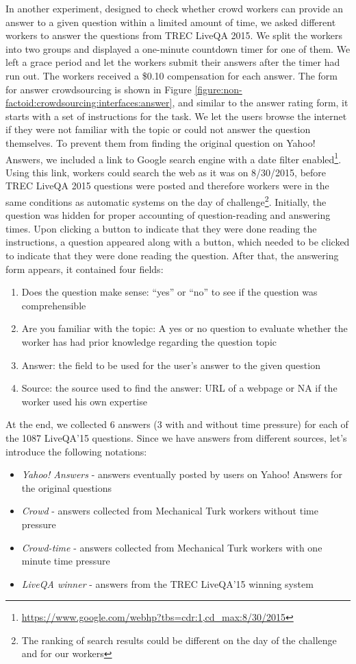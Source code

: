In another experiment, designed to check whether crowd workers can provide an answer to a given question within a limited amount of time, we asked different workers to answer the questions from TREC LiveQA 2015.
We split the workers into two groups and displayed a one-minute countdown timer for one of them.
We left a grace period and let the workers submit their answers after the timer had run out.
The workers received a \$0.10 compensation for each answer.
The form for answer crowdsourcing is shown in Figure \ref{figure:non-factoid:crowdsourcing:interfaces:answer}, and similar to the answer rating form, it starts with a set of instructions for the task.
We let the users browse the internet if they were not familiar with the topic or could not answer the question themselves.
To prevent them from finding the original question on Yahoo! Answers, we included a link to Google search engine with a date filter enabled\footnote{\href{url}{https://www.google.com/webhp?tbs=cdr:1,cd\_max:8/30/2015}}.
Using this link, workers could search the web as it was on 8/30/2015, before TREC LiveQA 2015 questions were posted and therefore workers were in the same conditions as automatic systems on the day of challenge\footnote{The ranking of search results could be different on the day of the challenge and for our workers}.
Initially, the question was hidden for proper accounting of question-reading and answering times.
Upon clicking a button to indicate that they were done reading the instructions, a question appeared along with a button, which needed to be clicked to indicate that they were done reading the question.
After that, the answering form appears, it contained four fields:
\begin{enumerate}[itemsep=0em]
\item Does the question make sense: ``yes'' or ``no'' to see if the question was comprehensible
\item Are you familiar with the topic: A yes or no question to evaluate whether the worker has had prior knowledge regarding the question topic
\item Answer: the field to be used for the user's answer to the given question
\item Source: the source used to find the answer: URL of a webpage or NA if the worker used his own expertise
\end{enumerate}

At the end, we collected 6 answers (3 with and without time pressure) for each of the 1087 LiveQA'15 questions.
Since we have answers from different sources, let's introduce the following notations:
\begin{itemize}[itemsep=0em]
    \item \textit{Yahoo! Answers} - answers eventually posted by users on Yahoo! Answers for the original questions
    \item \textit{Crowd} - answers collected from Mechanical Turk workers without time pressure
    \item \textit{Crowd-time} - answers collected from Mechanical Turk workers with one minute time pressure
    \item \textit{LiveQA winner} - answers from the TREC LiveQA'15 winning system
\end{itemize}

